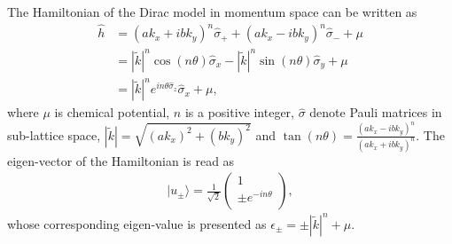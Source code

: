 \documentclass{article}
\begin{document}
The Hamiltonian of the Dirac model in momentum space can be written as 
\begin{align}
    \hat{h} &= \left(a k_x + ib k_y\right)^n \hat{\sigma}_+ + \left(a k_x - ib k_y\right)^n \hat{\sigma}_- + \mu \\
            &= \left\vert \widetilde{k}   \right\vert^n \cos(n \theta) \hat{\sigma}_x - \left\vert \widetilde{k}  \right\vert^n \sin(n \theta) \hat{\sigma}_y + \mu\\
            &= \left\vert \widetilde{k}  \right\vert^n e^{in \theta \hat{\sigma}_z}\hat{\sigma}_x + \mu,  
\end{align}
where $ \mu $ is chemical potential, $ n $ is a positive integer, $ \hat{\sigma} $ denote Pauli matrices in sub-lattice space, $ \left\vert \widetilde{k}  \right\vert= \sqrt{(a k_x)^2 + (b k_y)^2 }   $ and $ \tan(n \theta) = \frac{(ak_x-ibk_y)^n}{(ak_x+ibk_y)^n} $. The eigen-vector of the Hamiltonian is read as 
\begin{align}
    |u_\pm\rangle = \frac{1}{\sqrt{2} } \left(\begin{array}{c}
         1 \\
         \pm e^{-in \theta} \\
    \end{array}\right),
\end{align}
whose corresponding eigen-value is presented as $ \epsilon_{\pm} = \pm \left\vert \widetilde{k}  \right\vert^n + \mu   $. 
\end{document}
